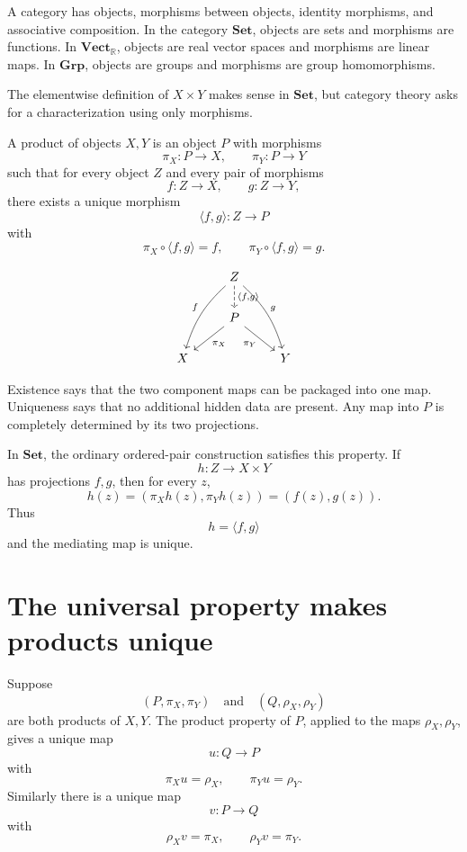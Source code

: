 A category has objects, morphisms between objects, identity morphisms, and associative composition.  In the category \(\mathbf{Set}\), objects are sets and morphisms are functions.  In \(\mathbf{Vect}_{\mathbb R}\), objects are real vector spaces and morphisms are linear maps.  In \(\mathbf{Grp}\), objects are groups and morphisms are group homomorphisms.

The elementwise definition of \(X\times Y\) makes sense in \(\mathbf{Set}\), but category theory asks for a characterization using only morphisms.

\begin{definition}
A product of objects \(X,Y\) is an object \(P\) with morphisms
\[
  \pi_X:P\to X,
  \qquad
  \pi_Y:P\to Y
\]
such that for every object \(Z\) and every pair of morphisms
\[
  f:Z\to X,
  \qquad
  g:Z\to Y,
\]
there exists a unique morphism
\[
  \langle f,g\rangle:Z\to P
\]
with
\[
  \pi_X\circ\langle f,g\rangle=f,
  \qquad
  \pi_Y\circ\langle f,g\rangle=g.
\]
\end{definition}

\[
\begin{tikzcd}
& Z \arrow[ddl,bend right=15,swap,"f"]
    \arrow[ddr,bend left=15,"g"]
    \arrow[d,dashed,"{\langle f,g\rangle}"] & \\
& P \arrow[dl,"\pi_X"] \arrow[dr,swap,"\pi_Y"] & \\
X && Y
\end{tikzcd}
\]

Existence says that the two component maps can be packaged into one map.  Uniqueness says that no additional hidden data are present.  Any map into \(P\) is completely determined by its two projections.

In \(\mathbf{Set}\), the ordinary ordered-pair construction satisfies this property.  If
\[
  h:Z\to X\times Y
\]
has projections \(f,g\), then for every \(z\),
\[
  h(z)=(\pi_Xh(z),\pi_Yh(z))=(f(z),g(z)).
\]
Thus
\[
  h=\langle f,g\rangle
\]
and the mediating map is unique.

\section{The universal property makes products unique}

Suppose
\[
  (P,\pi_X,\pi_Y)
  \quad\text{and}\quad
  (Q,\rho_X,\rho_Y)
\]
are both products of \(X,Y\).  The product property of \(P\), applied to the maps \(\rho_X,\rho_Y\), gives a unique map
\[
  u:Q\to P
\]
with
\[
  \pi_Xu=\rho_X,
  \qquad
  \pi_Yu=\rho_Y.
\]
Similarly there is a unique map
\[
  v:P\to Q
\]
with
\[
  \rho_Xv=\pi_X,
  \qquad
  \rho_Yv=\pi_Y.
\]

